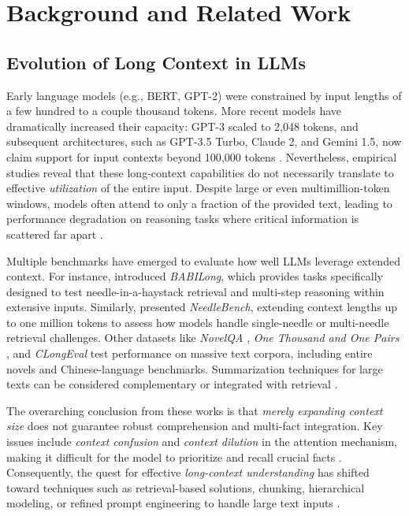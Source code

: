 \section{Background and Related Work}
\label{sec:background}

\subsection{Evolution of Long Context in LLMs}
Early language models (e.g., BERT, GPT-2) were constrained by input lengths of a few hundred to a couple thousand tokens. More recent models have dramatically increased their capacity: GPT-3 scaled to 2{,}048 tokens, and subsequent architectures, such as GPT-3.5 Turbo, Claude 2, and Gemini 1.5, now claim support for input contexts beyond 100{,}000 tokens \citep{georgiev2024gemini}. Nevertheless, empirical studies reveal that these long-context capabilities do not necessarily translate to effective \emph{utilization} of the entire input. Despite large or even multimillion-token windows, models often attend to only a fraction of the provided text, leading to performance degradation on reasoning tasks where critical information is scattered far apart \citep{kuratov2024babilong, zhang2024infinitybench, levy-etal-2024-task}.

Multiple benchmarks have emerged to evaluate how well LLMs leverage extended context. For instance, \cite{kuratov2024babilong} introduced \emph{BABILong}, which provides tasks specifically designed to test needle-in-a-haystack retrieval and multi-step reasoning within extensive inputs. Similarly, \cite{li2024needlebench} presented \emph{NeedleBench}, extending context lengths up to one million tokens to assess how models handle single-needle or multi-needle retrieval challenges. Other datasets like \emph{NovelQA} \citep{wang2025novelqa}, \emph{One Thousand and One Pairs} \citep{karpinska2024one}, and \emph{CLongEval} \citep{qiu-etal-2024-clongeval} test performance on massive text corpora, including entire novels and Chinese-language benchmarks. Summarization techniques for large texts can be considered complementary or integrated with retrieval \citep{koh2022empirical}.

The overarching conclusion from these works is that \emph{merely expanding context size} does not guarantee robust comprehension and multi-fact integration. Key issues include \emph{context confusion} and \emph{context dilution} in the attention mechanism, making it difficult for the model to prioritize and recall crucial facts \citep{lee2024can}. Consequently, the quest for effective \emph{long-context understanding} has shifted toward techniques such as retrieval-based solutions, chunking, hierarchical modeling, or refined prompt engineering to handle large text inputs \citep{shaham2022scrolls}.

